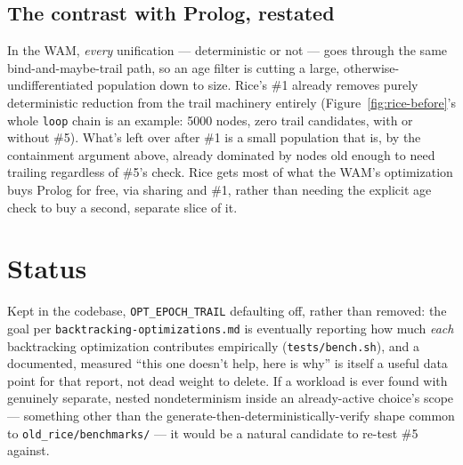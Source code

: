 \documentclass[11pt]{article}
\newcommand{\btomd}{\texttt{backtracking-\allowbreak optimizations.md}\xspace}
\begin{document}
\subsection{The contrast with Prolog, restated}

In the WAM, \emph{every} unification --- deterministic or not --- goes
through the same bind-and-maybe-trail path, so an age filter is cutting a
large, otherwise-undifferentiated population down to size. Rice's \#1
already removes purely deterministic reduction from the trail machinery
entirely (Figure~\ref{fig:rice-before}'s whole \texttt{loop} chain is an
example: 5000 nodes, zero trail candidates, with or without \#5). What's
left over after \#1 is a small population that is, by the containment
argument above, already dominated by nodes old enough to need trailing
regardless of \#5's check. Rice gets most of what the WAM's optimization
buys Prolog for free, via sharing and \#1, rather than needing the
explicit age check to buy a second, separate slice of it.

\section{Status}

Kept in the codebase, \texttt{OPT\_\allowbreak EPOCH\_\allowbreak TRAIL} defaulting off, rather
than removed: the goal per \btomd is
eventually reporting how much \emph{each} backtracking optimization
contributes empirically (\texttt{tests/bench.sh}), and a documented,
measured ``this one doesn't help, here is why'' is itself a useful data
point for that report, not dead weight to delete. If a workload is ever
found with genuinely separate, nested nondeterminism inside an
already-active choice's scope --- something other than the
generate-then-deterministically-verify shape common to
\texttt{old\_rice/\allowbreak benchmarks/} --- it would be a natural candidate to
re-test \#5 against.
\end{document}
